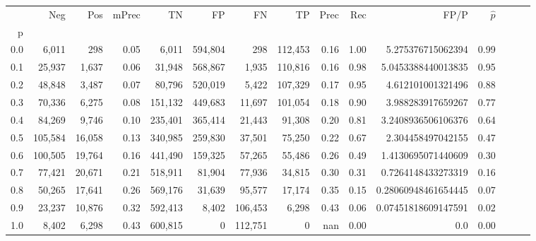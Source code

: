 \begin{tabular}{rrrrrrrrrrrrrrr}
\toprule
{} &      Neg &     Pos & mPrec &       TN &       FP &       FN &       TP &  Prec &   Rec &                 FP/P & $\hat{p}$ \\
p   &          &         &       &          &          &          &          &       &       &                      &           \\
\midrule
0.0 &    6,011 &     298 &  0.05 &    6,011 &  594,804 &      298 &  112,453 &  0.16 &  1.00 &    5.275376715062394 &      0.99 \\
0.1 &   25,937 &   1,637 &  0.06 &   31,948 &  568,867 &    1,935 &  110,816 &  0.16 &  0.98 &   5.0453388440013835 &      0.95 \\
0.2 &   48,848 &   3,487 &  0.07 &   80,796 &  520,019 &    5,422 &  107,329 &  0.17 &  0.95 &    4.612101001321496 &      0.88 \\
0.3 &   70,336 &   6,275 &  0.08 &  151,132 &  449,683 &   11,697 &  101,054 &  0.18 &  0.90 &    3.988283917659267 &      0.77 \\
0.4 &   84,269 &   9,746 &  0.10 &  235,401 &  365,414 &   21,443 &   91,308 &  0.20 &  0.81 &   3.2408936506106376 &      0.64 \\
0.5 &  105,584 &  16,058 &  0.13 &  340,985 &  259,830 &   37,501 &   75,250 &  0.22 &  0.67 &    2.304458497042155 &      0.47 \\
0.6 &  100,505 &  19,764 &  0.16 &  441,490 &  159,325 &   57,265 &   55,486 &  0.26 &  0.49 &   1.4130695071440609 &      0.30 \\
0.7 &   77,421 &  20,671 &  0.21 &  518,911 &   81,904 &   77,936 &   34,815 &  0.30 &  0.31 &   0.7264148433273319 &      0.16 \\
0.8 &   50,265 &  17,641 &  0.26 &  569,176 &   31,639 &   95,577 &   17,174 &  0.35 &  0.15 &  0.28060948461654445 &      0.07 \\
0.9 &   23,237 &  10,876 &  0.32 &  592,413 &    8,402 &  106,453 &    6,298 &  0.43 &  0.06 &  0.07451818609147591 &      0.02 \\
1.0 &    8,402 &   6,298 &  0.43 &  600,815 &        0 &  112,751 &        0 &   nan &  0.00 &                  0.0 &      0.00 \\
\bottomrule
\end{tabular}
